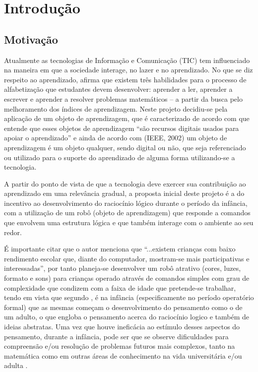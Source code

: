 \section{Introdução}

\subsection{Motivação}

Atualmente as tecnologias de Informação e Comunicação (TIC) tem influenciado na maneira em que a sociedade interage, no lazer e no aprendizado. No que se diz respeito ao aprendizado, \cite{rauber:2003} afirma que existem três habilidades para o processo de alfabetização que estudantes devem desenvolver: aprender a ler, aprender a escrever e aprender a resolver problemas matemáticos – a partir da busca pelo melhoramento dos índices de aprendizagem. Neste projeto decidiu-se pela aplicação de um objeto de aprendizagem, que é caracterizado de acordo com \cite{tarouco:2004} que entende que esses objetos de aprendizagem “são recursos digitais usados para apoiar o aprendizado” e ainda de acordo com (IEEE, 2002) um objeto de aprendizagem é um objeto qualquer, sendo digital ou não, que seja referenciado ou utilizado para o suporte do aprendizado de alguma forma utilizando-se a tecnologia.

A partir do ponto de vista de que a tecnologia deve exercer sua contribuição ao aprendizado em uma relevância gradual, a proposta inicial deste projeto é a do incentivo ao desenvolvimento do raciocínio lógico durante o período da infância, com a utilização de um robô (objeto de aprendizagem) que responde a comandos que envolvem uma estrutura lógica e que também interage com o ambiente ao seu redor.

É importante citar que o autor \cite{weis:2001} menciona que “...existem crianças com baixo rendimento escolar que, diante do computador, mostram-se mais participativas e interessadas”, por tanto planeja-se desenvolver um robô atrativo (cores, luzes, formato e sons) para crianças operado através de comandos simples com grau de complexidade que condizem com a faixa de idade que pretende-se trabalhar, tendo em vista que segundo \cite{piaget:1975}, é na infância (especificamente no período operatório formal) que as mesmas começam o desenvolvimento do pensamento como o de um adulto, o que engloba o pensamento acerca do raciocínio logico e também de ideias abstratas. Uma vez que houve ineficácia ao estímulo desses aspectos do pensamento, durante a infância, pode ser que se observe dificuldades para compreensão e/ou resolução de problemas futuros mais complexos, tanto na matemática como em outras áreas de conhecimento na vida universitária e/ou adulta \cite{rauber:2003}.

